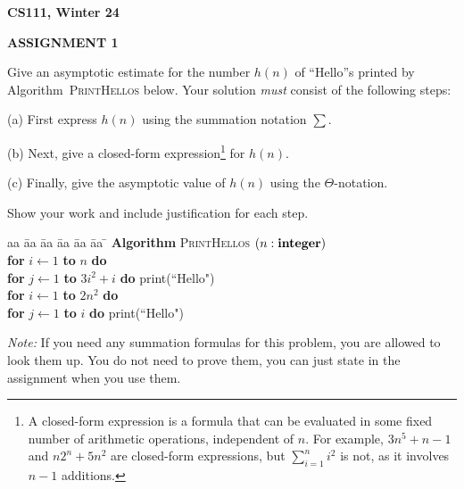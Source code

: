 \documentclass{article}
\begin{document}
\vspace{-0.15in}
\centerline{\large \bf CS111, Winter 24}
\vspace{0.1in}
\centerline{\large \bf ASSIGNMENT 1}


\vspace{0.1in}
\begin{problem}
Give an asymptotic estimate  for the number $h(n)$ of ``Hello''s printed by Algorithm~\textsc{PrintHellos} below.
Your solution \emph{must} consist of the following steps:
%
\begin{description}
\item{(a)} First express $h(n)$ using the summation notation $\sum$.
\item{(b)} Next, give a closed-form expression\footnote{A closed-form expression is a formula that can be evaluated
            in some fixed number of arithmetic operations, independent of $n$. For example, $3n^5+n-1$ and $n2^n+5n^2$
            are closed-form expressions, but $\sum_{i=1}^n i^2$ is not, as it involves $n-1$ additions.}
    for $h(n)$. 
\item{(c)}  Finally, give the asymptotic value of $h(n)$ using the $\Theta$-notation.
\end{description}
\noindent
Show your work and include justification for each step. 



\begin{tabbing}
aa \= aa \= aa \= aa \= aa \= aa \= \kill
\textbf{Algorithm} \textsc{PrintHellos} $(n: \mbox{\bf integer})$ \\
      \> \textbf{for} $i \leftarrow 1$ \textbf{to} $n$ \textbf{do} \\
      \> \> \textbf{for} $j \leftarrow 1$ \textbf{to} $3i^2+i$ \textbf{do} print(``Hello") \\
      \> \textbf{for} $i \leftarrow 1$ \textbf{to} $2n^2$
                         \textbf{do} \\
      \> \> \textbf{for} $j \leftarrow 1$ \textbf{to} $i$ \textbf{do}  print(``Hello") 
\end{tabbing}




\noindent
\emph{Note:} If you need any summation formulas for this problem, you are allowed to look them up. You do not need to
prove them, you can just state  in the assignment when you use them.
\end{problem}

\end{document}

